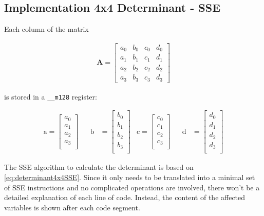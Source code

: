 \newpage
\subsection{Implementation 4x4 Determinant - SSE}
\label{sec:determinant4x4SSE}

Each column of the matrix

\begin{align*}
\mathbf{A}
=
\begin{bmatrix}
a_0&b_0&c_0&d_0\\
a_1&b_1&c_1&d_1\\
a_2&b_2&c_2&d_2\\
a_3&b_3&c_3&d_3
\end{bmatrix}
\end{align*}

is stored in a \texttt{__m128} register:

\begin{align*}
\mathrm{a} 
=
\begin{bmatrix}
a_0\\
a_1\\
a_2\\
a_3\\
\end{bmatrix}
&&
\mathrm{b} 
&=
\begin{bmatrix}
b_0\\
b_1\\
b_2\\
b_3\\
\end{bmatrix}
&
\mathrm{c} 
=
\begin{bmatrix}
c_0\\
c_1\\
c_2\\
c_3\\
\end{bmatrix}
&&
\mathrm{d} 
&=
\begin{bmatrix}
d_0\\
d_1\\
d_2\\
d_3\\
\end{bmatrix}
\end{align*}



The SSE algorithm to calculate the determinant is based on \cref{eq:determinant4x4SSE}.
Since it only needs to be translated into a minimal set of SSE instructions and no complicated operations are involved, there won't be a detailed explanation of each line of code.
Instead, the content of the affected variables is shown after each code segment.

